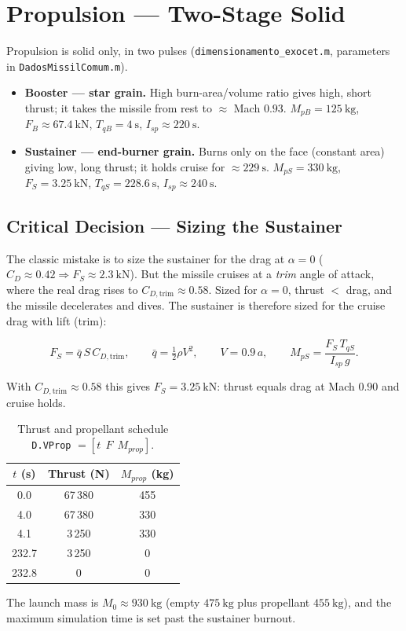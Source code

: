 \section{Propulsion --- Two-Stage Solid}

Propulsion is solid only, in two pulses (\texttt{dimensionamento\_exocet.m}, parameters in \texttt{DadosMissilComum.m}).

\begin{itemize}
    \item \textbf{Booster --- star grain.} High burn-area/volume ratio gives high, short thrust; it takes the missile from rest to $\approx$ Mach $0.93$. $M_{pB}=125~\text{kg}$, $F_B\approx 67.4~\text{kN}$, $T_{qB}=4~\text{s}$, $I_{sp}\approx 220~\text{s}$.
    \item \textbf{Sustainer --- end-burner grain.} Burns only on the face (constant area) giving low, long thrust; it holds cruise for $\approx 229~\text{s}$. $M_{pS}=330~\text{kg}$, $F_S=3.25~\text{kN}$, $T_{qS}=228.6~\text{s}$, $I_{sp}\approx 240~\text{s}$.
\end{itemize}

\subsection{Critical Decision --- Sizing the Sustainer}

The classic mistake is to size the sustainer for the drag at $\alpha=0$ ($C_D\approx 0.42\Rightarrow F_S\approx 2.3~\text{kN}$). But the missile cruises at a \emph{trim} angle of attack, where the real drag rises to $C_{D,\text{trim}}\approx 0.58$. Sized for $\alpha=0$, thrust $<$ drag, and the missile decelerates and dives. The sustainer is therefore sized for the cruise drag with lift (trim):

\[
    F_S=\bar q\,S\,C_{D,\text{trim}},\qquad
    \bar q=\tfrac12\rho V^2,\qquad
    V=0.9\,a,\qquad
    M_{pS}=\frac{F_S\,T_{qS}}{I_{sp}\,g}.
\]

With $C_{D,\text{trim}}\approx 0.58$ this gives $F_S=3.25~\text{kN}$: thrust equals drag at Mach $0.90$ and cruise holds.

\begin{table}[H]
\centering
\caption{Thrust and propellant schedule \texttt{D.VProp} $=[t~~F~~M_{prop}]$.}
\begin{tabular}{ccc}
\toprule
$t$ (s) & Thrust (N) & $M_{prop}$ (kg) \\
\midrule
0.0   & 67\,380 & 455 \\
4.0   & 67\,380 & 330 \\
4.1   & 3\,250  & 330 \\
232.7 & 3\,250  & 0 \\
232.8 & 0       & 0 \\
\bottomrule
\end{tabular}
\end{table}

The launch mass is $M_0\approx 930~\text{kg}$ (empty $475~\text{kg}$ plus propellant $455~\text{kg}$), and the maximum simulation time is set past the sustainer burnout.
